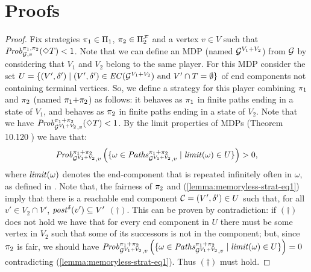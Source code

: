 \newenvironment{myproof}[1][]{\begingroup\renewcommand{\proofname}{\textbf{Proof #1}}\begin{proof}}{\end{proof}\endgroup}


\section{Proofs}\label{sec:appendix}


\begin{myproof}[of Lemma~\ref{lemma:memoryless-strat}]
  Fix strategies $\pi_{1} \in \Pi_{1}$, $\pi_{2} \in
  \Pi^{\mathcal{F}}_{2}$ and a vertex $v \in V$ such that
  $\mathit{Prob}^{\pi_{1}, \pi_{2}}_{\mathcal{G}, v}(\Diamond T) < 1$.
  Note that we can define an MDP (named $\mathcal{G}^{V_1{+}V_2}$) from
  $\mathcal{G}$ by considering that $V_1$ and $V_2$ belong to the same
  player.  For this MDP consider the set $U = \{ (V',\delta')
  \mid(V',\delta') \in \mathit{EC}(\mathcal{G}^{V_1{+}V_2}) \text{ and }
  V'\cap T = \emptyset \}$ of end components not containing terminal
  vertices.  So, we define a strategy for this player combining
  $\pi_{1}$ and $\pi_{2}$ (named $\pi_{1}{+}\pi_{2}$) as
  follows: it behaves as $\pi_{1}$ in finite paths ending in a state
  of $V_1$, and behaves as $\pi_{2}$ in finite paths ending in a
  state of $V_2$. Note that we have
  $\mathit{Prob}^{\pi_{1}{+}\pi_{2}}_{\mathcal{G}^{V_1+V_2},v}(\Diamond T) <
  1$. By the limit properties of MDPs (Theorem 10.120 \cite{BaierK08})
  we have that:
  \begin{equation}\label{lemma:memoryless-strat-eq1}
    \mathit{Prob}^{\pi_{1}{+}\pi_{2}}_{\mathcal{G}^{V_1+V_2},v} \left(\{ \omega \in \mathit{Paths}^{\pi_{1}{+}\pi_{2}}_{\mathcal{G}^{V_1+V_2},v} \mid \mathit{limit}(\omega)  \in U \}\right) > 0,
  \end{equation}
  where $\mathit{limit}(\omega)$ denotes the end-component that is repeated
  infinitely often in $\omega$, as defined in \cite{BaierK08}.  Note
  that, the fairness of $\pi_{2}$ and
  (\ref{lemma:memoryless-strat-eq1}) imply that there is a reachable
  end component $\mathcal{C}= (V',\delta') \in U$ such that, for all
  $v' \in V_2 \cap V'$, $\mathit{post}^\delta(v') \subseteq V'$ $(\dag)$.
  This
  can be proven by contradiction: if $(\dag)$ does not hold we have
  that for every end component in $U$ there must be some vertex in
  $V_2$ such that some of its successors is not in the component; but,
  since $\pi_{2}$ is fair, we should have
  $\mathit{Prob}^{\pi_{1}{+}\pi_{2}}_{\mathcal{G}^{V_1+V_2},v} \left ( \{ \omega \in \mathit{Paths}^{\pi_{1}{+}\pi_{2}}_{\mathcal{G}^{V_1+V_2},v} \mid \mathit{limit}(\omega) \in U \}\right) = 0$
  contradicting (\ref{lemma:memoryless-strat-eq1}). Thus $(\dag)$ must hold.


\end{myproof}

